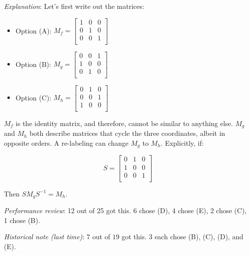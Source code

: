 \documentclass[10pt]{amsart}
\begin{document}
\begin{enumerate}
  {\em Explanation}: Let's first write out the matrices:

  \begin{itemize}
  \item Option (A): $M_f = \left[\begin{matrix} 1 & 0 & 0 \\ 0 & 1 & 0 \\ 0 & 0 & 1 \\\end{matrix}\right]$
  \item Option (B): $M_g = \left[\begin{matrix} 0 & 0 & 1 \\ 1 & 0 & 0 \\ 0 & 1 & 0 \\\end{matrix}\right]$
  \item Option (C): $M_h = \left[\begin{matrix} 0 & 1 & 0 \\ 0 & 0 & 1 \\ 1 & 0 & 0 \\\end{matrix}\right]$
  \end{itemize}

  $M_f$ is the identity matrix, and therefore, cannot be similar to
  anything else. $M_g$ and $M_h$ both describe matrices that cycle the
  three coordinates, albeit in opposite orders. A re-labeling can
  change $M_g$ to $M_h$. Explicitly, if:

  $$S = \left[\begin{matrix} 0 & 1 & 0 \\ 1 & 0 & 0 \\ 0 & 0 & 1 \\\end{matrix}\right]$$

  Then $SM_gS^{-1} = M_h$.

  {\em Performance review}: 12 out of 25 got this. 6 chose (D), 4
  chose (E), 2 chose (C), 1 chose (B).

  {\em Historical note (last time)}: $7$ out of $19$ got this. $3$ each chose
  (B), (C), (D), and (E).

\end{enumerate}
\end{document}
